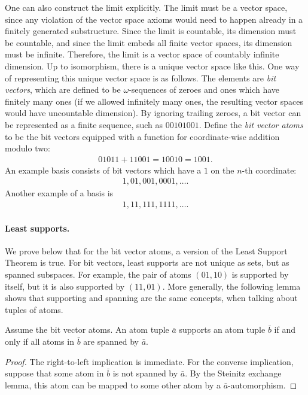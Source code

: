 One can also construct the \fraisse limit explicitly. 
The \fraisse limit must be a vector space, since any violation of the vector space axioms would need to happen already in a finitely generated substructure. Since the \fraisse limit is countable, its dimension must be countable, and since the \fraisse limit embeds all finite vector spaces, its dimension must be infinite. Therefore, the \fraisse limit is a vector space of countably infinite dimension. Up to isomorphism, there is a unique vector space like this. One way of representing this unique vector space is as follows. The elements are \emph{bit vectors}, which are defined to be $\omega$-sequences of zeroes and ones which have finitely many ones (if we allowed infinitely many ones, the resulting vector spaces would have uncountable dimension). By ignoring trailing zeroes, a bit vector can be represented as a finite sequence, such as $00101001$. Define the \emph{bit vector atoms} to be the bit vectors equipped with a function for coordinate-wise addition modulo two:
	\begin{align*}
		01011 + 11001 = 10010 = 1001.
	\end{align*}
An example basis consists of bit vectors which have a $1$ on the $n$-th coordinate:
\begin{align*}
	1, 01,001,0001,\ldots.
\end{align*}
Another example of a basis is
\begin{align*}
1,11,111,1111,\ldots.
\end{align*}
 
 


\paragraph*{Least supports.} We prove below that for the bit vector atoms, a version of the Least Support Theorem is true.  For bit vectors, least supports are not unique as sets, but as spanned subspaces. For example, the pair of atoms $(01,10)$ is supported by itself, but it is also supported by $(11,01)$. More generally, the following lemma shows that supporting and spanning are the same concepts, when talking about tuples of atoms. 
\begin{lemma} Assume the bit vector atoms. 
 An atom tuple $\bar a$ supports an atom tuple $\bar b$ if and only if all atoms in $\bar b$ are spanned by $\bar a$. 
\end{lemma}
\begin{proof}
 The right-to-left implication is immediate. For the converse implication, suppose that some atom in $\bar b$ is not spanned by $\bar a$. By the Steinitz exchange lemma, this atom can be mapped to some other atom by a $\bar a$-automorphism.
\end{proof}

